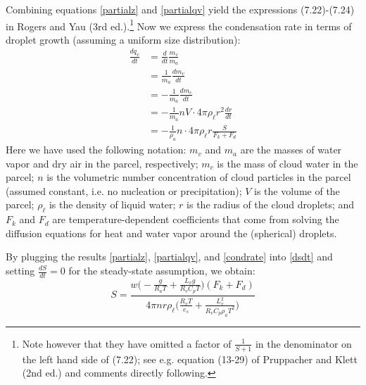 \documentclass{article}
\begin{document}
Combining equations \eqref{partialz} and \eqref{partialqv} yield the expressions (7.22)-(7.24) in Rogers and Yau (3rd ed.).\footnote{Note however that they have omitted a factor of $\frac{1}{S+1}$ in the denominator on the left hand side of (7.22); see e.g. equation (13-29) of Pruppacher and Klett (2nd ed.) and comments directly following.}
Now we express the condensation rate in terms of droplet growth (assuming a uniform size distribution):
\begin{align}
\label{condrate}
\frac{dq_v}{dt} &= \frac{d}{dt}\frac{m_v}{m_a}\nonumber\\
&=\frac{1}{m_a}\frac{dm_v}{dt}\nonumber\\
&=-\frac{1}{m_a}\frac{dm_c}{dt}\nonumber\\
&=-\frac{1}{m_a}nV\cdot4\pi\rho_{\ell}r^2\frac{dr}{dt}\nonumber\\
&=-\frac{1}{\rho_a}n\cdot4\pi\rho_{\ell}r\frac{S}{F_k + F_d} 
\end{align}
Here we have used the following notation: $m_v$ and $m_a$ are the masses of water vapor and dry air in the parcel, respectively; $m_c$ is the mass of cloud water in the parcel; $n$ is the volumetric number concentration of cloud particles in the parcel (assumed constant, i.e. no nucleation or precipitation); $V$ is the volume of the parcel; $\rho_{\ell}$ is the density of liquid water; $r$ is the radius of the cloud droplets; and $F_k$ and $F_d$ are temperature-dependent coefficients that come from solving the diffusion equations for heat and water vapor around the (spherical) droplets.

By plugging the results \eqref{partialz}, \eqref{partialqv}, and \eqref{condrate} into \eqref{dsdt} and setting $\frac{dS}{dt}=0$ for the steady-state assumption, we obtain:
\begin{equation}
S = \frac{w\Big(-\frac{g}{R_aT} + \frac{L_vg}{R_vC_pT}\Big)(F_k + F_d)}{4\pi nr\rho_{\ell}\Big(\frac{R_vT}{e_s} + \frac{L_v^2}{R_vC_p\rho_aT^2}\Big)}
\end{equation}
\end{document}
